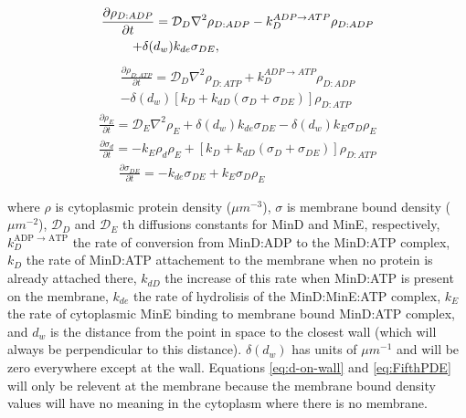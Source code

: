 \documentclass[letterpaper,twocolumn,amsmath,amssymb,pre]{revtex4-1}
\begin{document}
\begin{multline}
  \frac{\partial \rho_{D:ADP}}{\partial t} = \mathcal{D}_D\nabla^2\rho_{D:ADP}-k_D^{ADP\rightarrow ATP}\rho_{D:ADP}\\
  +\delta(d_w)k_{de}\sigma_{DE},\hspace{3.4cm}
\end{multline}
\begin{multline}
  \frac{\partial \rho_{D:ATP}}{\partial t} = \mathcal{D}_D\nabla^2\rho_{D:ATP}+k_D^{ADP\rightarrow ATP}\rho_{D:ADP}\\
  -\delta(d_w)[k_D+k_{dD}(\sigma_D+\sigma_{DE})]\rho_{D:ATP}
\end{multline}
\begin{multline}
  \frac{\partial \rho_E}{\partial t} = \mathcal{D}_E\nabla^2\rho_E+\delta(d_w)k_{de}\sigma_{DE}
  -\delta(d_w)k_E \sigma_D \rho_E
\end{multline}
\begin{multline}
  \frac{\partial \sigma_d}{\partial t} = -k_E\rho_d\rho_E
  +[k_D+k_{dD}(\sigma_D+\sigma_{DE})]\rho_{D:ATP}
  \label{eq:d-on-wall}
\end{multline}
\begin{multline}
  \frac{\partial \sigma_{DE}}{\partial t} = -k_{de}\sigma_{DE}+k_E\sigma_D\rho_E\hspace{3cm}
  \label{eq:FifthPDE}
\end{multline}

where $\rho$ is cytoplasmic protein density ($\mu m^{-3}$), $\sigma$
is membrane bound density ($\mu m^{-2}$), $\mathcal{D}_D$ and
$\mathcal{D}_{E}$ th diffusions constants for MinD and MinE,
respectively, $k_D^{\textrm{ADP $\rightarrow$ ATP}}$ the rate of
conversion from MinD:ADP to the MinD:ATP complex, $k_D$ the rate of
MinD:ATP attachement to the membrane when no protein is already
attached there, $k_{dD}$ the increase of this rate when MinD:ATP is
present on the membrane, $k_{de}$ the rate of hydrolisis of the
MinD:MinE:ATP complex, $k_E$ the rate of cytoplasmic MinE binding to
membrane bound MinD:ATP complex, and $d_w$ is the distance from the
point in space to the closest wall (which will always be
perpendicular to this distance).  $\delta(d_w)$ has units of
$\mu m^{-1}$ and will be zero everywhere except at the wall.
Equations \ref{eq:d-on-wall} and \ref{eq:FifthPDE} will only be
relevent at the membrane because the membrane bound density values
will have no meaning in the cytoplasm where there is no membrane.
\end{document}
